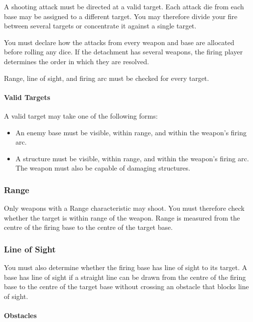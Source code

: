 A shooting attack must be directed at a valid target. Each attack die from each base may be assigned to a different target. You may therefore divide your fire between several targets or concentrate it against a single target.

You must declare how the attacks from every weapon and base are allocated before rolling any dice. If the detachment has several weapons, the firing player determines the order in which they are resolved.

Range, line of sight, and firing arc must be checked for every target.

\paragraph{Valid Targets}

A valid target may take one of the following forms:

\begin{itemize}
    \item An enemy base must be visible, within range, and within the weapon's firing arc.
    \item A structure must be visible, within range, and within the weapon's firing arc. The weapon must also be capable of damaging structures.
\end{itemize}

\subsubsection{Range}

Only weapons with a Range characteristic may shoot. You must therefore check whether the target is within range of the weapon. Range is measured from the centre of the firing base to the centre of the target base.

\subsubsection{Line of Sight}

You must also determine whether the firing base has line of sight to its target. A base has line of sight if a straight line can be drawn from the centre of the firing base to the centre of the target base without crossing an obstacle that blocks line of sight.

\paragraph{Obstacles}

